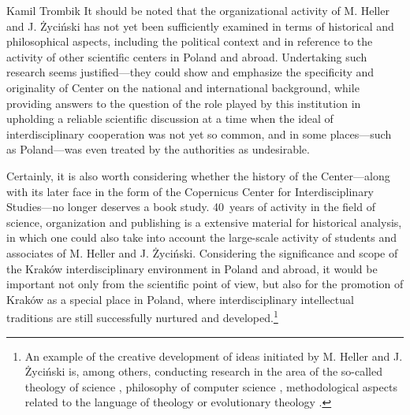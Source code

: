 \begin{artengenv}{Kamil Trombik}
It should be noted that the organizational activity of M. Heller and J. Życiński has not yet been sufficiently examined
in terms of historical and philosophical aspects, including the political context and in reference to the activity of
other scientific centers in Poland and abroad. Undertaking such research seems justified---they could show and emphasize
the specificity and originality of Center on the national and international background, while providing answers to the
question of the role played by this institution in upholding a reliable scientific discussion at a time when the ideal
of interdisciplinary cooperation was not yet so common, and in some places---such as Poland---was even treated by the
authorities as undesirable.

Certainly, it is also worth considering whether the history of the Center---along with its later face in the form of the
Copernicus Center for Interdisciplinary Studies---no longer deserves a book study. 40~years of activity in the field of
science, organization and publishing is a extensive material for historical analysis, in which one could also take into
account the large-scale activity of students and associates of M. Heller and J. Życiński. Considering the significance
and scope of the Kraków interdisciplinary environment in Poland and abroad, it would be important not only from the
scientific point of view, but also for the promotion of Kraków as a special place in Poland, where interdisciplinary
intellectual traditions are still successfully nurtured and developed.\footnote{An example of the creative development
of ideas initiated by M. Heller and J. Życiński is, among others, conducting research in the area of the so-called
theology of science
\parencite{maczka_teologia_2015},
philosophy of computer science
\parencite{polak_computing_2016,polak_current_2017,polak_miedzy_2018,krzanowski_minimal_2017},
methodological aspects related
to the language of theology
\parencite{olszewski_negation_2018}
or evolutionary theology
\parencite{grygiel_what_2018}.
}


\end{artengenv}\label{trombik-stop}
